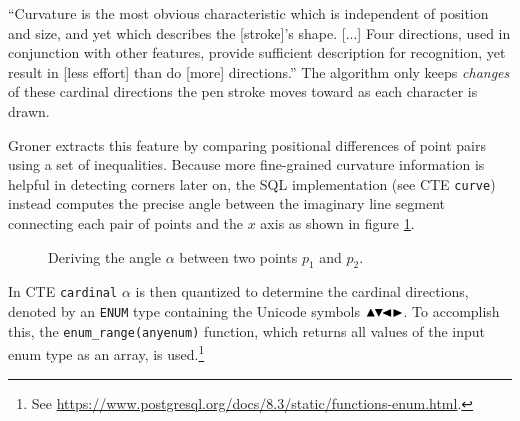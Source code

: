 \documentclass[sigconf]{acmart}
\begin{document}
\enquote{Curvature is the most obvious characteristic which is independent of position and size, and yet which describes the [stroke]'s shape. [...] Four directions, used in conjunction with other features, provide sufficient description for recognition, yet result in [less effort] than do [more] directions.} \cite{groner} The algorithm only keeps \textit{changes} of these cardinal directions the pen stroke moves toward as each character is drawn.

Groner extracts this feature by comparing positional differences of point pairs using a set of inequalities. Because more fine-grained curvature information is helpful in detecting corners later on, the SQL implementation (see CTE \texttt{curve}) instead computes the precise angle between the imaginary line segment connecting each pair of points and the $x$ axis as shown in figure \ref{tan}.

\begin{figure}[htpb]
  \centering
  \caption{Deriving the angle $\alpha$ between two points $p_1$ and $p_2$.}
  \label{tan}
\end{figure}

In CTE \texttt{cardinal} $\alpha$ is then quantized to determine the cardinal directions, denoted by an \texttt{ENUM} type containing the Unicode symbols $\blacktriangle\hspace{-0.15em}\blacktriangledown\hspace{-0.45em}\blacktriangleleft\blacktriangleright$. To accomplish this, the \texttt{enum\_range(anyenum)} function, which returns all values of the input enum type as an array, is used.\footnote{See \url{https://www.postgresql.org/docs/8.3/static/functions-enum.html}.}
\end{document}

